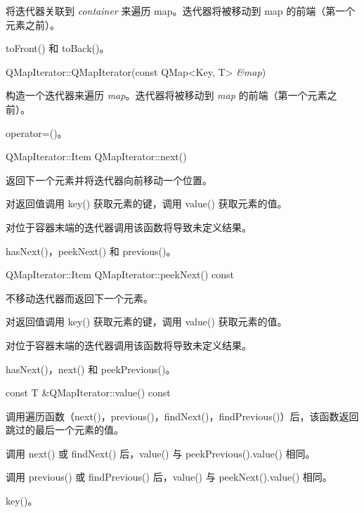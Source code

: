将迭代器关联到 \emph{container} 来遍历 map。迭代器将被移动到 map 的前端（第一个元素之前）。


\begin{seeAlso}
toFront() 和 toBack()。
\end{seeAlso}

\splitLine

QMapIterator::QMapIterator(const QMap<Key, T> \emph{\&map})

构造一个迭代器来遍历 \emph{map}。迭代器将被移动到 \emph{map} 的前端（第一个元素之前）。


\begin{seeAlso}
operator=()。
\end{seeAlso}

\splitLine

QMapIterator::Item QMapIterator::next()

返回下一个元素并将迭代器向前移动一个位置。

对返回值调用 key() 获取元素的键，调用 value() 获取元素的值。

对位于容器末端的迭代器调用该函数将导致未定义结果。

\begin{seeAlso}
hasNext()，peekNext() 和 previous()。
\end{seeAlso}
    
\splitLine

QMapIterator::Item QMapIterator::peekNext() const

不移动迭代器而返回下一个元素。

对返回值调用 key() 获取元素的键，调用 value() 获取元素的值。

对位于容器末端的迭代器调用该函数将导致未定义结果。

\begin{seeAlso}
hasNext()，next() 和 peekPrevious()。
\end{seeAlso}

\splitLine

const T \&QMapIterator::value() const

调用遍历函数（next()，previous()，findNext()，findPrevious()）后，该函数返回跳过的最后一个元素的值。

调用 next() 或 findNext() 后，value() 与 peekPrevious().value() 相同。

调用 previous() 或 findPrevious() 后，value() 与 peekNext().value() 相同。

\begin{seeAlso}
key()。
\end{seeAlso}